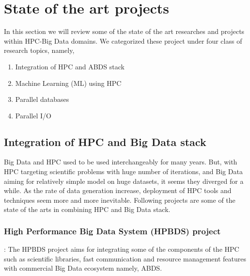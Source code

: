 \documentclass[runningheads,a4paper]{llncs}
\begin{document}
\section{State of the art projects}
In this section we will review some of the state of the art researches and projects within HPC-Big Data domains. We categorized these project under four class of research topics, namely,
\begin{enumerate}
	\item Integration of HPC and ABDS stack
	\item Machine Learning (ML) using HPC
	\item Parallel databases
	\item Parallel I/O
	
\end{enumerate}
\subsection{Integration of HPC and Big Data stack}
Big Data and HPC used to be used interchangeably for many years. But, with HPC targeting scientific problems with huge number of iterations, and Big Data aiming for relatively simple model on huge datasets, it seems they diverged for a while. As the rate of data generation increase, deployment of HPC tools and techniques seem more and more inevitable. Following projects are some of the state of the arts in combining HPC and Big Data stack.
\subsubsection{High Performance Big Data System (HPBDS) project \cite{qiu2014towards}}: The HPBDS project aims for integrating some of the components of the HPC such as scientific libraries, fast communication and resource management features with commercial Big Data ecosystem namely, ABDS.\\
\end{document}
